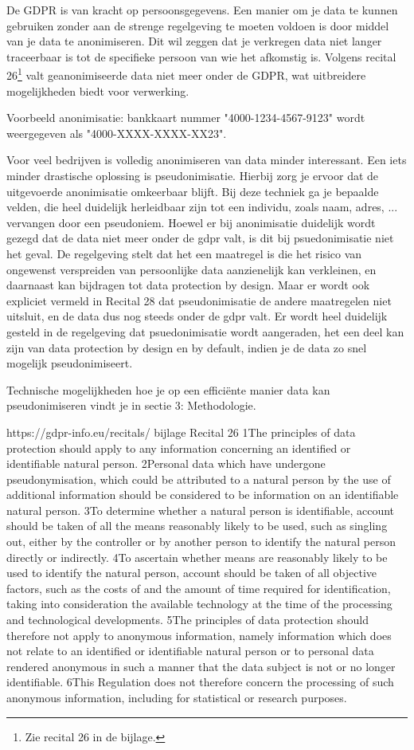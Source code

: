 De GDPR is van kracht op persoonsgegevens. Een manier om je data te kunnen gebruiken zonder aan de strenge regelgeving te moeten voldoen is door middel van je data te anonimiseren. Dit wil zeggen dat je verkregen data niet langer traceerbaar is tot de specifieke persoon van wie het afkomstig is. Volgens recital 26\footnote{Zie recital 26 in de bijlage.} valt geanonimiseerde data niet meer onder de GDPR, wat uitbreidere mogelijkheden biedt voor verwerking. 

Voorbeeld anonimisatie: bankkaart nummer "4000-1234-4567-9123" wordt weergegeven als "4000-XXXX-XXXX-XX23". 

Voor veel bedrijven is volledig anonimiseren van data minder interessant. Een iets minder drastische oplossing is pseudonimisatie. Hierbij zorg je ervoor dat de uitgevoerde anonimisatie omkeerbaar blijft.  
Bij deze techniek ga je bepaalde velden, die heel duidelijk herleidbaar zijn tot een individu, zoals naam, adres, ... vervangen door een pseudoniem.
Hoewel er bij anonimisatie duidelijk wordt gezegd dat de data niet meer onder de gdpr valt, is dit bij psuedonimisatie niet het geval. De regelgeving stelt dat het een maatregel is die het risico van ongewenst verspreiden van persoonlijke data aanzienelijk kan verkleinen, en daarnaast kan bijdragen tot data protection by design. Maar er wordt ook expliciet vermeld in Recital 28 dat pseudonimisatie de andere maatregelen niet uitsluit, en de data dus nog steeds onder de gdpr valt. 
Er wordt heel duidelijk gesteld in de regelgeving dat psuedonimisatie wordt aangeraden, het een deel kan zijn van data protection by design en by default, indien je de data zo snel mogelijk pseudonimiseert. 

Technische mogelijkheden hoe je op een efficiënte manier data kan pseudonimiseren vindt je in sectie 3: Methodologie. 

https://gdpr-info.eu/recitals/ bijlage
Recital 26
1The principles of data protection should apply to any information concerning an identified or identifiable natural person. 2Personal data which have undergone pseudonymisation, which could be attributed to a natural person by the use of additional information should be considered to be information on an identifiable natural person. 3To determine whether a natural person is identifiable, account should be taken of all the means reasonably likely to be used, such as singling out, either by the controller or by another person to identify the natural person directly or indirectly. 4To ascertain whether means are reasonably likely to be used to identify the natural person, account should be taken of all objective factors, such as the costs of and the amount of time required for identification, taking into consideration the available technology at the time of the processing and technological developments. 5The principles of data protection should therefore not apply to anonymous information, namely information which does not relate to an identified or identifiable natural person or to personal data rendered anonymous in such a manner that the data subject is not or no longer identifiable. 6This Regulation does not therefore concern the processing of such anonymous information, including for statistical or research purposes.

